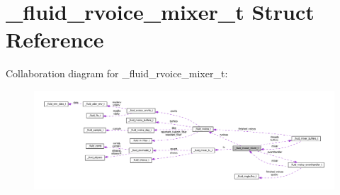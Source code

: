 \hypertarget{struct__fluid__rvoice__mixer__t}{}\section{\+\_\+fluid\+\_\+rvoice\+\_\+mixer\+\_\+t Struct Reference}
\label{struct__fluid__rvoice__mixer__t}


Collaboration diagram for \+\_\+fluid\+\_\+rvoice\+\_\+mixer\+\_\+t\+:
\nopagebreak
\begin{figure}[H]
\begin{center}
\leavevmode
\includegraphics[width=350pt]{struct__fluid__rvoice__mixer__t__coll__graph}
\end{center}
\end{figure}
